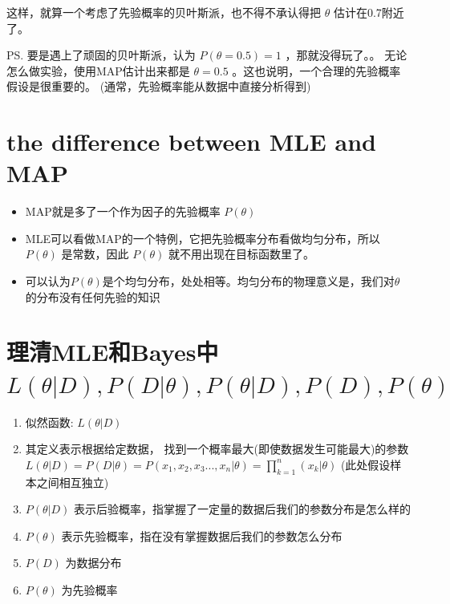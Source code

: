 \documentclass[12pt]{ctexart}%
\begin{document}
			这样，就算一个考虑了先验概率的贝叶斯派，也不得不承认得把 $\theta$ 估计在0.7附近了。
			
			PS. 要是遇上了顽固的贝叶斯派，认为 $P(\theta=0.5)=1$ ，那就没得玩了。。 无论怎么做实验，使用MAP估计出来都是 $\theta=0.5$ 。这也说明，一个合理的先验概率假设是很重要的。 (通常，先验概率能从数据中直接分析得到)
	
	\section{\quad the difference between MLE and MAP}
		\begin{itemize}
			\item 	MAP就是多了一个作为因子的先验概率 $P(\theta)$
			
			\item 	MLE可以看做MAP的一个特例，它把先验概率分布看做均匀分布，所以 $P(\theta)$ 是常数，因此 $P(\theta)$ 就不用出现在目标函数里了。
			
			\item 可以认为$P(\theta)$是个均匀分布，处处相等。均匀分布的物理意义是，我们对$\theta$的分布没有任何先验的知识
		\end{itemize}
	
	\section{\quad 理清MLE和Bayes中 $L(\theta|D), P(D|\theta), P(\theta|D), P(D), P(\theta)$}
			\begin{enumerate}
				\item 似然函数: $L(\theta|D)$ 
				
				\item 其定义表示根据给定数据， 找到一个概率最大(即使数据发生可能最大)的参数  $L(\theta|D) = P(D|\theta) = P(x_1, x_2, x_3...,x_n|\theta) = \prod\limits_{k=1}^{n}(x_k|\theta)$ (此处假设样本之间相互独立)
				
				\item $P(\theta|D)$ 表示后验概率，指掌握了一定量的数据后我们的参数分布是怎么样的
				
				\item $P(\theta)$ 表示先验概率，指在没有掌握数据后我们的参数怎么分布
				
				\item $P(D)$ 为数据分布
				
				\item $P(\theta)$ 为先验概率
			\end{enumerate}
		
\end{document}
